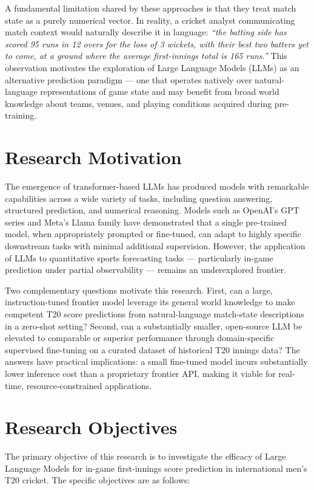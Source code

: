 A fundamental limitation shared by these approaches is that they treat match state as a purely numerical vector. In reality, a cricket analyst communicating match context would naturally describe it in language: \textit{``the batting side has scored 95 runs in 12 overs for the loss of 3 wickets, with their best two batters yet to come, at a ground where the average first-innings total is 165 runs.''} This observation motivates the exploration of Large Language Models (LLMs) as an alternative prediction paradigm --- one that operates natively over natural-language representations of game state and may benefit from broad world knowledge about teams, venues, and playing conditions acquired during pre-training.

\section{Research Motivation}

The emergence of transformer-based LLMs has produced models with remarkable capabilities across a wide variety of tasks, including question answering, structured prediction, and numerical reasoning. Models such as OpenAI's GPT series and Meta's Llama family have demonstrated that a single pre-trained model, when appropriately prompted or fine-tuned, can adapt to highly specific downstream tasks with minimal additional supervision. However, the application of LLMs to quantitative sports forecasting tasks --- particularly in-game prediction under partial observability --- remains an underexplored frontier.

Two complementary questions motivate this research. First, can a large, instruction-tuned frontier model leverage its general world knowledge to make competent T20 score predictions from natural-language match-state descriptions in a zero-shot setting? Second, can a substantially smaller, open-source LLM be elevated to comparable or superior performance through domain-specific supervised fine-tuning on a curated dataset of historical T20 innings data? The answers have practical implications: a small fine-tuned model incurs substantially lower inference cost than a proprietary frontier API, making it viable for real-time, resource-constrained applications.

\section{Research Objectives}

The primary objective of this research is to investigate the efficacy of Large Language Models for in-game first-innings score prediction in international men's T20 cricket. The specific objectives are as follows:

